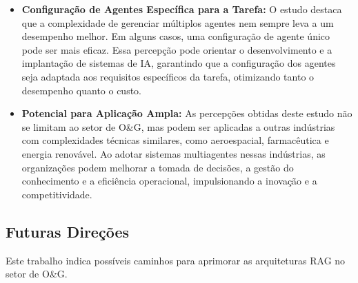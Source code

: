 \begin{itemize}
            
                \item \textbf{Configuração de Agentes Específica para a Tarefa:}            
                    O estudo destaca que a complexidade de gerenciar múltiplos agentes nem sempre leva a um desempenho melhor. Em alguns casos, uma configuração de agente único pode ser mais eficaz.
                    Essa percepção pode orientar o desenvolvimento e a implantação de sistemas de IA, garantindo que a configuração dos agentes seja adaptada aos requisitos específicos da tarefa, otimizando tanto o desempenho quanto o custo.
                
            
                \item \textbf{Potencial para Aplicação Ampla:}            
                    As percepções obtidas deste estudo não se limitam ao setor de O\&G, mas podem ser aplicadas a outras indústrias com complexidades técnicas similares, como aeroespacial, farmacêutica e energia renovável.
                    Ao adotar sistemas multiagentes nessas indústrias, as organizações podem melhorar a tomada de decisões, a gestão do conhecimento e a eficiência operacional, impulsionando a inovação e a competitividade.
                             
            \end{itemize}
    
    
        \subsection{Futuras Direções}
        
            Este trabalho indica possíveis caminhos para aprimorar as arquiteturas RAG no setor de O\&G.
            
